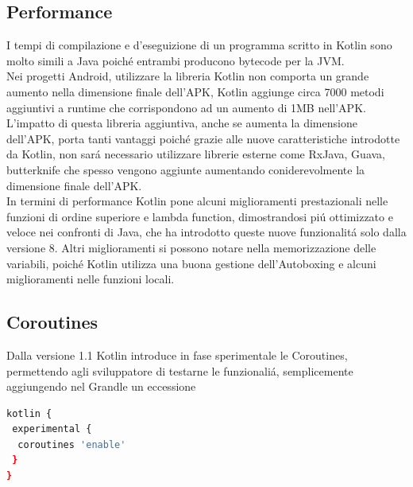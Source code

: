 \subsection{Performance}
I tempi di compilazione e d'eseguizione di un programma scritto in Kotlin sono molto simili a Java poich\'e entrambi producono bytecode per la JVM.\\
Nei progetti Android, utilizzare la libreria Kotlin non comporta un grande aumento nella dimensione finale dell'APK, Kotlin aggiunge circa 7000 metodi aggiuntivi a runtime che corrispondono ad un aumento di 1MB nell'APK. L'impatto di questa libreria aggiuntiva, anche se aumenta la dimensione dell'APK, porta tanti vantaggi poich\'e grazie alle nuove caratteristiche introdotte da Kotlin, non sar\'a necessario utilizzare librerie esterne come RxJava, Guava, butterknife che spesso vengono aggiunte aumentando coniderevolmente la dimensione finale dell'APK.\\
In termini di performance Kotlin pone alcuni miglioramenti prestazionali nelle funzioni di ordine superiore e lambda function, dimostrandosi pi\'u ottimizzato e veloce nei confronti di Java, che ha introdotto queste nuove funzionalit\'a solo dalla versione 8. Altri miglioramenti si possono notare nella memorizzazione delle variabili, poich\'e Kotlin utilizza una buona gestione dell'Autoboxing e alcuni miglioramenti nelle funzioni locali.




\subsection{Coroutines}
Dalla versione 1.1 Kotlin introduce in fase sperimentale le Coroutines, permettendo agli sviluppatore di testarne le funzionali\'a, semplicemente aggiungendo nel Grandle un eccessione
\begin{lstlisting}[language=bash,caption={Grandle Coroutines }]
kotlin {
 experimental {
  coroutines 'enable'
 }
}
\end{lstlisting}

